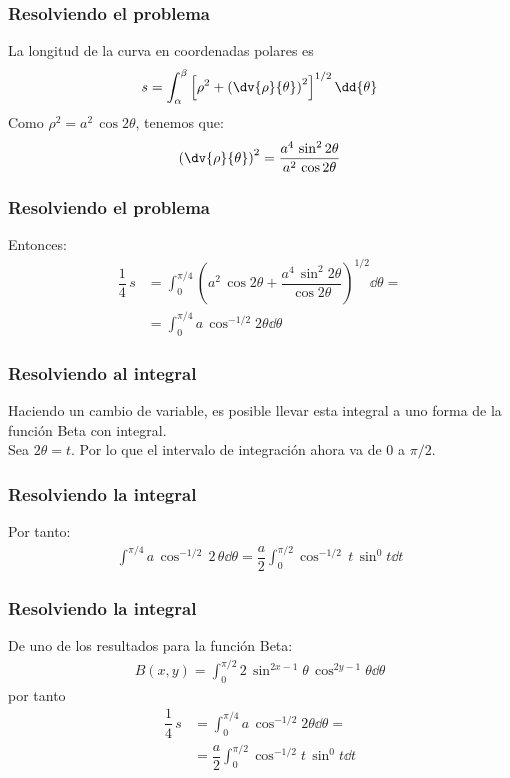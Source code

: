 \begin{frame}
\frametitle{Resolviendo el problema}
La longitud de la curva en coordenadas polares es
\begin{align*}
s = \int_{\alpha}^{\beta} \left[ \rho^{2} + \left( \dv{\rho}{\theta} \right)^{2} \right]^{1/2} \dd{\theta}
\end{align*}
\pause
Como $\rho^{2} = a^{2} \, \cos 2 \theta$, tenemos que:
\begin{align*}
\left( \dv{\rho}{\theta} \right)^{2} = \dfrac{a^{4} \, \sin^{2} 2 \theta}{a^{2} \, \cos 2 \theta}
\end{align*}
\end{frame}
\begin{frame}
\frametitle{Resolviendo el problema}
Entonces:
\begin{align*}
\dfrac{1}{4} \, s &= \int_{0}^{\pi/4} \left( a^{2} \, \cos 2 \theta + \dfrac{a^{4} \, \sin^{2} 2 \theta}{\cos 2 \theta} \right)^{1/2} \dd{\theta} = \\[1em]
&= \int_{0}^{\pi/4} a \, \cos^{-1/2} 2 \theta \dd{\theta}
\end{align*}
\end{frame}
\begin{frame}
\frametitle{Resolviendo al integral}
Haciendo un cambio de variable, es posible llevar esta integral a uno forma de la función Beta con integral.
\\
\bigskip
Sea $2 \theta = t$. Por lo que el intervalo de integración ahora va de $0$ a $\pi/2$.
\end{frame}
\begin{frame}
\frametitle{Resolviendo la integral}
Por tanto:
\begin{align*}
\int_{}^{\pi/4} a \, \cos^{-1/2} \, 2 \, \theta \dd{\theta} = \dfrac{a}{2} \int_{0}^{\pi/2} \cos^{-1/2} \, t \, \sin^{0} t \dd{t}
\end{align*}
\end{frame}
\begin{frame}
\frametitle{Resolviendo la integral}
De uno de los resultados para la función Beta:
\begin{align*}
B(x, y) = \int_{0}^{\pi/2} 2 \, \sin^{2x-1} \theta \, \cos^{2y-1} \theta \dd{\theta}
\end{align*}
\pause
por tanto
\begin{align*}
\dfrac{1}{4} \, s &= \int_{0}^{\pi/4} a \, \cos^{-1/2} 2 \theta \dd{\theta} =  \\[0.5em]
&= \dfrac{a}{2} \int_{0}^{\pi/2} \cos^{-1/2} t \, \sin^{0} t \dd{t}
\end{align*}
\end{frame}
